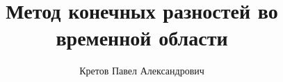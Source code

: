 %




\title{Метод конечных разностей во временной области}
\author{Кретов Павел Александрович}
\date{}


    
	
	
	
	
	
	
	
    
	
	
	
	
	
	
	
	

